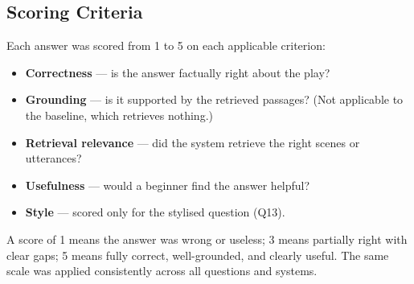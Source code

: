 \subsection{Scoring Criteria}
Each answer was scored from 1 to 5 on each applicable criterion:
\begin{itemize}
  \item \textbf{Correctness} --- is the answer factually right about the
  play?
  \item \textbf{Grounding} --- is it supported by the retrieved passages?
  (Not applicable to the baseline, which retrieves nothing.)
  \item \textbf{Retrieval relevance} --- did the system retrieve the
  right scenes or utterances?
  \item \textbf{Usefulness} --- would a beginner find the answer helpful?
  \item \textbf{Style} --- scored only for the stylised question (Q13).
\end{itemize}
A score of 1 means the answer was wrong or useless; 3 means partially
right with clear gaps; 5 means fully correct, well-grounded, and clearly
useful. The same scale was applied consistently across all questions and
systems.
